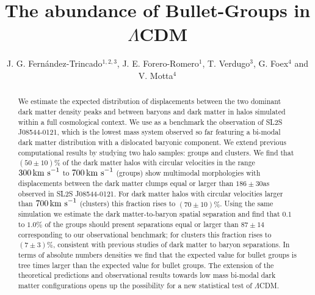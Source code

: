\documentclass{emulateapj}
\newcommand{\hkpc}{{\ifmmode{h^{-1}{\rm kpc}}\else{$h^{-1}$kpc }\fi}}
\newcommand{\kms}{{\ifmmode{{\mathrm{\,km\ s}^{-1}}}\else{\,km~s$^{-1}$}\fi}}
\newcommand{\bullg}{SL2S J08544-0121}
\begin{document}
 

\title{The abundance of Bullet-Groups in $\Lambda$CDM}
\author{J. G. Fern\'andez-Trincado$^{1,2,3}$, J. E. Forero-Romero$^1$,
  T. Verdugo$^3$, G. Foex$^4$ and V. Motta$^4$} 

\begin{abstract}

We estimate the expected distribution of displacements between the two
dominant dark matter density peaks and between baryons and dark matter
in halos simulated within a full cosmological context. We use as a benchmark the
observation of \bullg, which is the lowest mass system observed so far
featuring a bi-modal dark matter distribution with a dislocated 
baryonic component. We extend previous computational results by
studying two halo samples: groups and clusters. We find that $(50 \pm 10)\%$
of the dark matter halos with circular velocities in the range
$300\kms$ to $700\kms$ (groups) show multimodal morphologies with
displacements between the dark matter clumps equal or larger than
$186 \pm 30$\hkpc as observed in \bullg. For dark matter halos with
circular velocities larger than $700\kms$ (clusters) this fraction
rises to $(70 \pm 10)\%$. Using the same simulation we estimate the
dark matter-to-baryon spatial separation and find that $0.1$ to
$1.0\%$ of the groups should present separations equal or
larger than $87\pm 14$\hkpc corresponding to our observational
benchmark; for clusters this fraction rises to $(7\pm 3)\%$, consistent
with previous studies of dark matter to baryon separations. In terms
of absolute numbers densities we find that the expected value for
bullet groups is tree times larger than the expected value for bullet
groups. The extension of the theoretical predictions and observational
results towards low mass bi-modal dark matter configurations opens up
the possibility for a new statistical test of  $\Lambda$CDM.  
\end{abstract}
\end{document}
